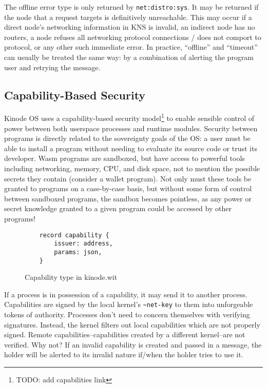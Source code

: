 \documentclass[runningheads]{llncs}
\begin{document}
The offline error type is only returned by \verb|net:distro:sys|.
It may be returned if the node that a request targets is definitively unreachable.
This may occur if a direct node's networking information in KNS is invalid, an indirect node has no routers, a node refuses all networking protocol connections / does not comport to protocol, or any other such immediate error.
In practice, ``offline'' and ``timeout'' can usually be treated the same way: by a combination of alerting the program user and retrying the message.

\subsection{Capability-Based Security}
\label{sec:oscapabilities}

Kinode OS uses a capability-based security model\footnote{TODO: add capabilities link}
to enable sensible control of power between both userspace processes and runtime modules.
Security between programs is directly related to the sovereignty goals of the OS: a user must be able to install a program without needing to evaluate its source code or trust its developer.
Wasm programs are sandboxed, but have access to powerful tools including networking, memory, CPU, and disk space, not to mention the possible secrets they contain (consider a wallet program).
Not only must these tools be granted to programs on a case-by-case basis, but without some form of control between sandboxed programs, the sandbox becomes pointless, as any power or secret knowledge granted to a given program could be accessed by other programs!

\begin{figure}[H]
    \centering
    \begin{lstlisting}
    record capability {
        issuer: address,
        params: json,
    }
    \end{lstlisting}
    \caption{Capability type in kinode.wit}
    \label{fig:WIT Types 3}
\end{figure}

If a process is in possession of a capability, it may send it to another process.
Capabilities are signed by the local kernel's \verb|~net-key| to  them into unforgeable tokens of authority. %
Processes don't need to concern themselves with verifying signatures.
Instead, the kernel filters out local capabilities which are not properly signed.
Remote capabilities–capabilities created by a different kernel–are not verified.
Why not?
If an invalid capability is created and passed in a message, the holder will be alerted to its invalid nature if/when the holder tries to use it.
\end{document}
